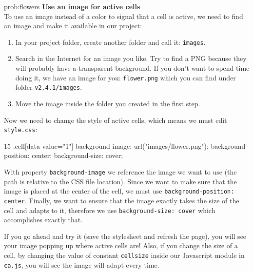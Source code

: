 \begin{sol}{prob:flowers}
\textbf{Use an image for active cells}\\
To use an image instead of a color to signal that a cell is active, we need to find an image and
make it available in our project:
\begin{enumerate}
  \item In your project folder, create another folder and call it: \texttt{images}.
  \item Search in the Internet for an image you like. Try to find a PNG because they will probably have
    a transparent background. If you don't want to spend time doing it, we have an image for you:
    \texttt{flower.png} which you can find under folder \texttt{v2.4.1/images}.
  \item Move the image inside the folder you created in the first step.
\end{enumerate}
Now we need to change the style
of active cells, which means we must edit \texttt{style.css}:
\begin{codeh1}{1}{5}
.cell[data-value="1"] {
  background-image: url("images/flower.png");
  background-position: center;
  background-size: cover;
}
\end{codeh1}
With property \texttt{background-image} we reference the image we want to use (the path is relative to the
CSS file location). Since we want to make sure that the image is placed at the center of the cell, we must use
\texttt{background-position: center}. Finally, we want to ensure that the image exactly takes the size of the
cell and adapts to it, therefore we use \texttt{background-size: cover} which accomplishes exactly that.

If you go ahead and try it (save the stylesheet and refresh the page),
you will see your image popping up where active cells are! Also, if you change the size of a cell,
by changing the value of constant \texttt{cellsize} inside our Javascript module in \texttt{ca.js},
you will see the image will adapt every time.
\end{sol}

